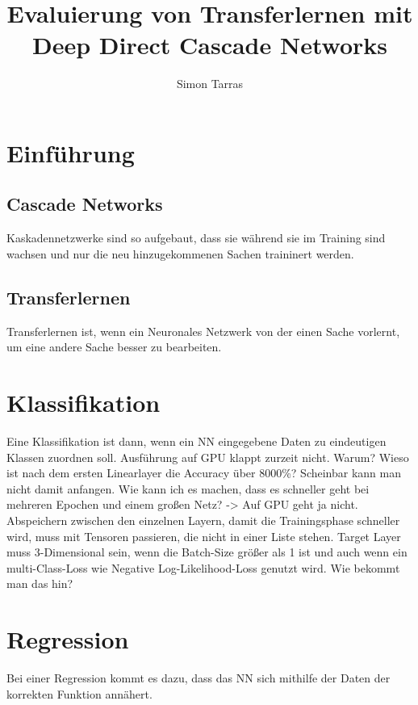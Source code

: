 \documentclass[ngerman]{report}
\title{Evaluierung von Transferlernen mit Deep Direct Cascade Networks}
\author{Simon Tarras}
\begin{document}
    \maketitle
    \chapter{Einführung}
        \section{Cascade Networks}
        Kaskadennetzwerke sind so aufgebaut, dass sie während sie 
        im Training sind wachsen und nur die neu hinzugekommenen 
        Sachen traininert werden.
        \section{Transferlernen}
        Transferlernen ist, wenn ein Neuronales Netzwerk von der 
        einen Sache vorlernt, um eine andere Sache besser zu 
        bearbeiten.
    \chapter{Klassifikation}
    Eine Klassifikation ist dann, wenn ein NN eingegebene Daten zu 
    eindeutigen Klassen zuordnen soll.
    Ausführung auf GPU klappt zurzeit nicht. Warum?
    Wieso ist nach dem ersten Linearlayer die Accuracy über 8000\%?
    Scheinbar kann man nicht damit anfangen.
    Wie kann ich es machen, dass es schneller geht bei mehreren Epochen 
    und einem großen Netz? -> Auf GPU geht ja nicht.
    Abspeichern zwischen den einzelnen Layern, damit die Trainingsphase 
    schneller wird, muss mit Tensoren passieren, die nicht in einer Liste 
    stehen. 
    Target Layer muss 3-Dimensional sein, wenn die Batch-Size größer als 1 
    ist und auch wenn ein multi-Class-Loss wie Negative Log-Likelihood-Loss 
    genutzt wird. Wie bekommt man das hin?
    \chapter{Regression}
    Bei einer Regression kommt es dazu, dass das NN sich mithilfe 
    der Daten der korrekten Funktion annähert.
\end{document}

